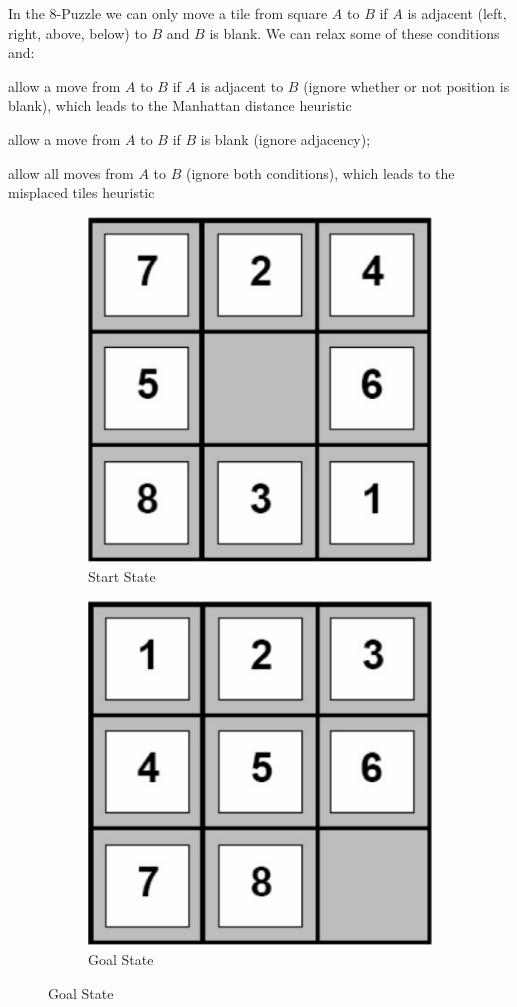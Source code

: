 \begin{example}
    In the 8-Puzzle we can only move a tile from square $A$ to $B$ if $A$ is adjacent (left, right, above, below) to $B$ and $B$ is blank. We can relax some of these conditions and:

    \begin{listo}
        \item allow a move from $A$ to $B$ if $A$ is adjacent to $B$ (ignore whether or not position is blank), which leads to the Manhattan distance heuristic

        \item allow a move from $A$ to $B$ if $B$ is blank (ignore adjacency);

        \item allow all moves from $A$ to $B$ (ignore both conditions), which leads to the misplaced tiles heuristic
    \end{listo}

    \begin{figure}[ht!]
        \centering

        \begin{subfigure}[t]{0.45\linewidth}
            \centering
            \includegraphics*[width=0.45\linewidth]{figures/8-puzzle-start.png}
            \caption*{Start State}
        \end{subfigure}
        \hfil%
        \begin{subfigure}[t]{0.45\linewidth}
            \centering
            \includegraphics*[width=0.45\linewidth]{figures/8-puzzle-goal.png}
            \caption*{Goal State}
        \end{subfigure}
    \end{figure}


\end{example}
